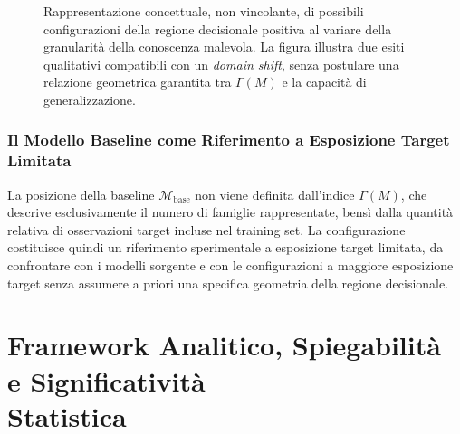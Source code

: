 \begin{figure}[H]
    \caption{Rappresentazione concettuale, non vincolante, di possibili configurazioni della regione decisionale positiva al variare della granularità della conoscenza malevola. La figura illustra due esiti qualitativi compatibili con un \textit{domain shift}, senza postulare una relazione geometrica garantita tra $\Gamma(M)$ e la capacità di generalizzazione.}
    \label{fig:domain_shift_granularity}
\end{figure}


\subsubsection{Il Modello Baseline come Riferimento a Esposizione Target Limitata}
\label{subsubsec:baseline_riferimento_granularita}
La posizione della baseline $\mathcal{M}_{\text{base}}$ non viene definita dall'indice $\Gamma(M)$, che descrive esclusivamente il numero di famiglie rappresentate, bensì dalla quantità relativa di osservazioni target incluse nel training set. La configurazione costituisce quindi un riferimento sperimentale a esposizione target limitata, da confrontare con i modelli sorgente e con le configurazioni a maggiore esposizione target senza assumere a priori una specifica geometria della regione decisionale.

\section[Framework Analitico, Spiegabilità e Significatività Statistica]{Framework Analitico, Spiegabilità e Significatività\\Statistica}
\label{sec:framework_analitico}

